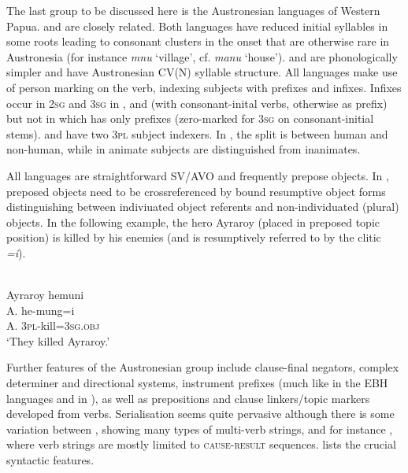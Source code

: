 The last group to be discussed here is the Austronesian languages of Western Papua.  and  are closely related. Both languages have reduced initial syllables in some roots leading to consonant clusters in the onset that are otherwise rare in Austronesia (for instance  \textit{mnu} `village', cf.  \textit{manu} `house').  and  are phonologically simpler and have Austronesian CV(N) syllable structure. All languages make use of person marking on the verb, indexing subjects with prefixes and infixes. Infixes occur in \textsc{2sg} and \textsc{3sg} in ,  and  (with consonant-inital verbs, otherwise as prefix) but not in  which has only prefixes (zero-marked for \textsc{3sg} on consonant-initial stems).  and  have two \textsc{3pl} subject indexers. In , the split is between human and non-human, while in  animate subjects are distinguished from inanimates.

All languages are straightforward SV/AVO and frequently prepose objects. In , preposed objects need to be crossreferenced by bound resumptive object forms distinguishing between indiviuated object referents and non-individuated (plural) objects. In the following example, the hero Ayraroy (placed in preposed topic position) is killed by his enemies (and is resumptively referred to by the clitic \textit{=i}).

\ea 
{}\\
\glll Ayraroy hemuni \\
A. he-mung=i \\
A. \textsc{3}\textsc{pl}-kill=\textsc{3}\textsc{sg}.\textsc{obj} \\
\glft `They killed Ayraroy.'
\z

Further features of the Austronesian group include clause-final negators, complex determiner and directional systems, instrument prefixes (much like in the EBH languages and in ), as well as prepositions and clause linkers/topic markers developed from verbs. Serialisation seems quite pervasive although there is some variation between , showing many types of multi-verb strings, and for instance , where verb strings are mostly limited to \textsc{cause-result} sequences.  lists the crucial syntactic features.

